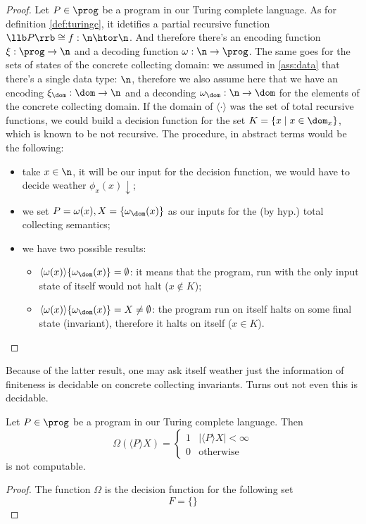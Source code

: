 \begin{proof}
  Let \(P\in\prog\) be a program in our Turing complete language. As
  for definition \ref{def:turingc}, it idetifies a partial recursive
  function \(\llb P \rrb \cong f : \n \htor \n\). And therefore
  there's an encoding function \(\xi : \prog \to \n\) and a decoding
  function \(\omega : \n \to \prog\). The same goes for the sets of
  states of the concrete collecting domain: we assumed in
  \ref{ass:data} that there's a single data type: \(\n\), therefore we
  also assume here that we have an encoding \(\xi_\dom : \dom \to \n\)
  and a deconding \(\omega_\dom : \n \to \dom\) for the elements of
  the concrete collecting domain. If the domain of \(\langle \cdot
  \rangle\) was the set of total recursive functions, we could build a
  decision function for the set \(K = \{x \mid x \in \dom_x\}\), which
  is known to be not recursive. The procedure, in abstract terms would
  be the following:
  \begin{itemize}
  \item take \(x \in \n\), it will be our input for the decision
    function, we would have to decide weather \(\phi_x(x)\downarrow\);
  \item we set \(P = \omega(x), X = \{\omega_\dom(x)\}\) as our inputs
    for the (by hyp.) total collecting semantics;
  \item we have two possible results:
    \begin{itemize}
    \item \(\langle \omega(x) \rangle \{\omega_\dom(x)\} =
      \emptyset\): it means that the program, run with the only input
      state of itself would not halt (\(x\not\in K\));
    \item \(\langle \omega(x) \rangle \{\omega_\dom(x)\} = X \neq
      \emptyset\): the program run on itself halts on some final state
      (invariant), therefore it halts on itself (\(x\in K\)).
    \end{itemize}
  \end{itemize}
\end{proof}

Because of the latter result, one may ask itself weather just the
information of finiteness is decidable on concrete collecting
invariants. Turns out not even this is decidable.

\begin{theorem}
  Let \(P\in\prog\) be a program in our Turing complete language. Then
  \[\Omega(\langle P \rangle X) = \begin{cases} 1 & |\langle P \rangle
    X| < \infty \\ 0 & \text{otherwise} \end{cases}\] is not computable.
\end{theorem}

\begin{proof}
  The function \(\Omega\) is the decision function for the following
  set \[F = \{\}\]
\end{proof}


